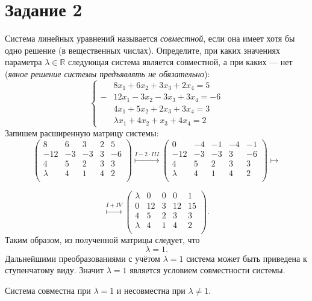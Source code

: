 \documentclass[a4paper,12pt]{article}
\begin{document}
\section*{Задание 2}
Система линейных уравнений называется {\it совместной}, если она имеет хотя бы одно решение (в вещественных числах).
Определите, при каких значениях параметра $\lambda \in \mathbb{R}$ следующая система является совместной, а при каких --- нет
({\it явное решение системы предъявлять не обязательно}):
$$\left\{
\begin{aligned}
&8x_1 + 6 x_2 + 3 x_3 +2x_4 = 5\\
-&12x_1 - 3x_2 -3x_3 + 3x_4 = -6\\
&4x_1 +5x_2 +2x_3 + 3x_4 = 3\\
& \lambda x_1 + 4x_2 + x_3 + 4x_4= 2
\end{aligned}
\right.$$
 Запишем расширенную матрицу системы:
$$ \left(\begin{array}{cccc|c}
8 & 6 & 3 & 2 & 5 \\
-12 & -3 & -3 & 3 & -6 \\
4 & 5 & 2 & 3 & 3 \\
\lambda & 4 & 1 & 4 & 2 \\
\end{array} \right) 
\overset{I-2\cdot III}{\longmapsto}
\left(\begin{array}{cccc|c}
0 & -4 & -1 & -4 & -1 \\
-12 & -3 & -3 & 3 & -6 \\
4 & 5 & 2 & 3 & 3 \\
\lambda & 4 & 1 & 4 & 2 \\
\end{array} \right) 
\longmapsto $$

$$ 
\overset{I+IV}{\longmapsto}
\left(\begin{array}{cccc|c}
\lambda & 0 & 0 & 0 & 1 \\
0 & 12 & 3 & 12 & 15 \\
4 & 5 & 2 & 3 & 3 \\
\lambda & 4 & 1 & 4 & 2 \\
\end{array} \right).$$
Таким образом, из полученной матрицы следует, что 
$$\lambda = 1.$$
Дальнейшими преобразованиями с учётом $\lambda = 1$ система может быть приведена к ступенчатому виду. Значит $\lambda = 1$ является условием совместности системы. \par
\vspace{1ex}
 Система совместна при $\lambda = 1$ и несовместна при $\lambda \neq 1$.
\end{document}
